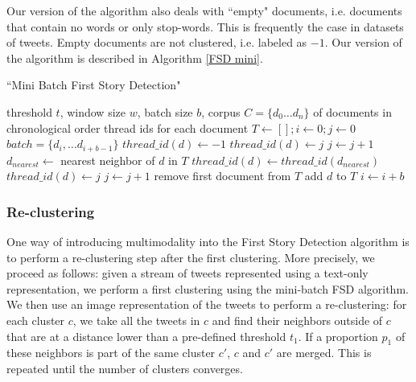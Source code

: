  Our version of the algorithm also deals with ``empty" documents, i.e. documents that contain no words or only stop-words. This is frequently the case in datasets of tweets. Empty documents are not clustered, i.e. labeled as $-1$. Our version of the algorithm is described in Algorithm \ref{FSD mini}.
\begin{algorithm}
\caption{``Mini Batch First Story Detection"}
\label{FSD mini}
\begin{algorithmic}[1]
\REQUIRE threshold $t$, window size $w$, batch size $b$, corpus $C=\{d_0 \ldots d_n\}$ of documents in chronological order
\ENSURE thread ids for each document
\STATE $T \leftarrow \left[ \right] ; i \leftarrow 0  ; j \leftarrow 0 $
\STATE $batch = \{d_{i}, \ldots d_{i + b -1}\}$
    \STATE $thread\_id(d) \leftarrow -1$
    \ELSE
    \STATE $thread\_id(d) \leftarrow j$
    \STATE $j \leftarrow j+1$
    \ELSE
    \STATE $d_{nearest} \leftarrow $ nearest neighbor of $d$ in $T$
    \STATE $thread\_id(d) \leftarrow thread\_id(d_{nearest})$
    \ELSE
    \STATE $thread\_id(d) \leftarrow j$
    \STATE $j \leftarrow j+1$
    \ENDIF
    \ENDIF
    \STATE remove first document from $T$
    \ENDIF
    \ENDIF
    \STATE add $d$ to $T$
    \STATE $i \leftarrow i + b$
    \ENDFOR
\ENDWHILE
\end{algorithmic}
\end{algorithm}



\subsubsection{Re-clustering}
\label{SubSec: reclustering}
One way of introducing multimodality into the First Story Detection algorithm is to perform a re-clustering step after the first clustering. More precisely, we proceed as follows: given a stream of tweets represented using a text-only representation, we perform a first clustering using the  mini-batch FSD algorithm. We then use an image representation of the tweets to perform a re-clustering: for each cluster $c$, we take all the tweets in $c$ and find their neighbors outside of $c$ that are at a distance lower than a pre-defined threshold $t_1$. If a proportion $p_1$ of these neighbors is part of the same cluster $c'$, $c$ and $c'$ are merged. This is repeated until the number of clusters converges.


